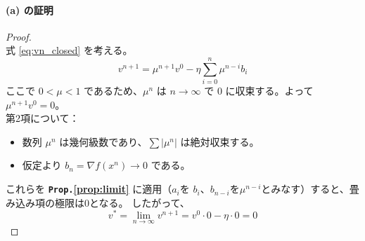 \documentclass[dvipdfmx,a4paper,11pt]{jsarticle}
\begin{document}
\paragraph{(a) の証明}

\begin{proof}\ \\

\noindent
式 \eqref{eq:vn_closed} を考える。
\[
v^{n+1} = \mu^{n+1} v^0 - \eta \sum_{i=0}^{n} \mu^{n-i} b_i
\]
ここで $0 < \mu < 1$ であるため、$\mu^n$ は $n \to \infty$ で $0$ に収束する。よって$\mu^{n+1} v^0 = 0$。\\
第2項について：
\begin{itemize}
    \item 数列 $\mu^n$ は幾何級数であり、$\sum |\mu^n|$ は絶対収束する。
    \item 仮定より $b_n = \nabla f(x^n) \to 0$ である。
\end{itemize}
これらを \textbf{\texttt{Prop.}\ref{prop:limit}} に適用（$a_i$を $b_i$、$b_{n-i}$を$\mu^{n-i}$とみなす）すると、畳み込み項の極限は0となる。
したがって、
\[
v^* = \lim_{n \to \infty} v^{n+1} =  v^0 \cdot 0 - \eta \cdot 0 = 0
\]
\end{proof}
\end{document}
